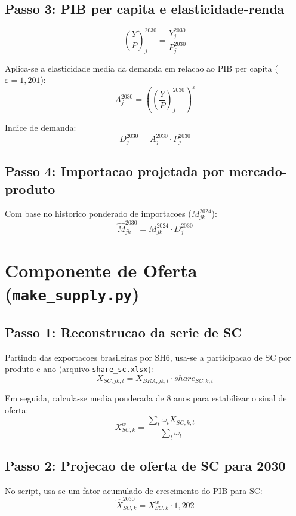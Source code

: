 \documentclass[12pt,a4paper]{article}
\begin{document}
\subsection{Passo 3: PIB per capita e elasticidade-renda}
\begin{equation}
\left(\frac{Y}{P}\right)_j^{2030} = \frac{Y_j^{2030}}{P_j^{2030}}
\end{equation}

Aplica-se a elasticidade media da demanda em relacao ao PIB per capita ($\varepsilon=1{,}201$):
\begin{equation}
A_j^{2030} = \left(\left(\frac{Y}{P}\right)_j^{2030}\right)^{\varepsilon}
\end{equation}

Indice de demanda:
\begin{equation}
D_j^{2030} = A_j^{2030} \cdot P_j^{2030}
\end{equation}

\subsection{Passo 4: Importacao projetada por mercado-produto}
Com base no historico ponderado de importacoes ($M_{jk}^{2024}$):
\begin{equation}
\widehat{M}_{jk}^{2030} = M_{jk}^{2024} \cdot D_j^{2030}
\end{equation}

\section{Componente de Oferta (\texttt{make\_supply.py})}
\subsection{Passo 1: Reconstrucao da serie de SC}
Partindo das exportacoes brasileiras por SH6, usa-se a participacao de SC por produto e ano (arquivo \texttt{share\_sc.xlsx}):
\begin{equation}
X_{SC,jk,t} = X_{BRA,jk,t} \cdot share_{SC,k,t}
\end{equation}

Em seguida, calcula-se media ponderada de 8 anos para estabilizar o sinal de oferta:
\begin{equation}
X_{SC,k}^{w} = \frac{\sum_t \omega_t X_{SC,k,t}}{\sum_t \omega_t}
\end{equation}

\subsection{Passo 2: Projecao de oferta de SC para 2030}
No script, usa-se um fator acumulado de crescimento do PIB para SC:
\begin{equation}
\widehat{X}_{SC,k}^{2030} = X_{SC,k}^{w} \cdot 1{,}202
\end{equation}
\end{document}

